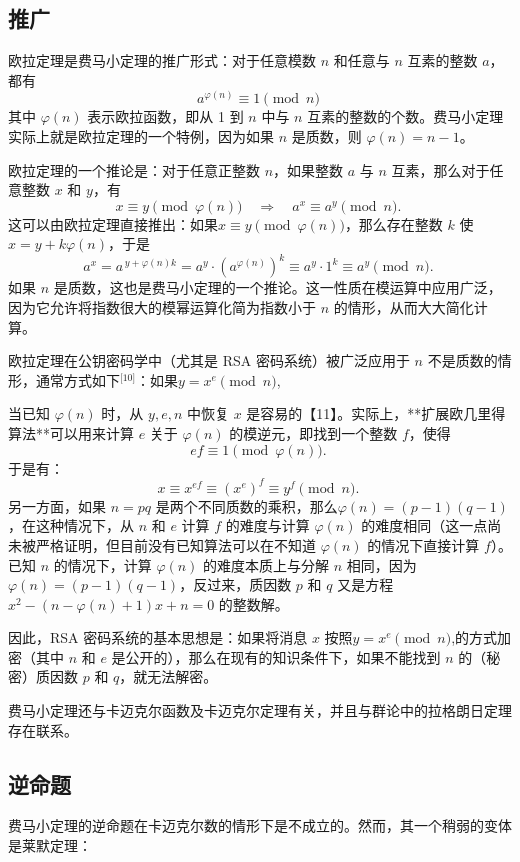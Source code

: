 \subsection{推广}
欧拉定理是费马小定理的推广形式：对于任意模数 $n$ 和任意与 $n$ 互素的整数 $a$，都有
$$
a^{\varphi(n)} \equiv 1 \pmod{n}~
$$
其中 $\varphi(n)$ 表示欧拉函数，即从 1 到 $n$ 中与 $n$ 互素的整数的个数。费马小定理实际上就是欧拉定理的一个特例，因为如果 $n$ 是质数，则 $\varphi(n) = n - 1$。

欧拉定理的一个推论是：对于任意正整数 $n$，如果整数 $a$ 与 $n$ 互素，那么对于任意整数 $x$ 和 $y$，有
$$
x \equiv y \pmod{\varphi(n)} \quad \Rightarrow \quad a^x \equiv a^y \pmod{n}.~
$$
这可以由欧拉定理直接推出：如果$x \equiv y \pmod{\varphi(n)}$，那么存在整数 $k$ 使 $x = y + k\varphi(n)$，于是
$$
a^x = a^{\,y + \varphi(n)k} = a^y \cdot \left(a^{\varphi(n)}\right)^k \equiv a^y \cdot 1^k \equiv a^y \pmod{n}.~
$$
如果 $n$ 是质数，这也是费马小定理的一个推论。这一性质在模运算中应用广泛，因为它允许将指数很大的模幂运算化简为指数小于 $n$ 的情形，从而大大简化计算。

欧拉定理在公钥密码学中（尤其是 RSA 密码系统）被广泛应用于 $n$ 不是质数的情形，通常方式如下\(^\text{[10]}\)：如果$y = x^e \pmod{n}$,

当已知 $\varphi(n)$ 时，从 $y, e, n$ 中恢复 $x$ 是容易的【11】。实际上，**扩展欧几里得算法**可以用来计算 $e$ 关于 $\varphi(n)$ 的模逆元，即找到一个整数 $f$，使得
$$
ef \equiv 1 \pmod{\varphi(n)}.~
$$
于是有：
$$
x \equiv x^{ef} \equiv (x^e)^f \equiv y^f \pmod{n}.~
$$
另一方面，如果 $n = pq$ 是两个不同质数的乘积，那么$\varphi(n) = (p - 1)(q - 1)$，在这种情况下，从 $n$ 和 $e$ 计算 $f$ 的难度与计算 $\varphi(n)$ 的难度相同（这一点尚未被严格证明，但目前没有已知算法可以在不知道 $\varphi(n)$ 的情况下直接计算 $f$）。已知 $n$ 的情况下，计算 $\varphi(n)$ 的难度本质上与分解 $n$ 相同，因为$\varphi(n) = (p - 1)(q - 1)$，反过来，质因数 $p$ 和 $q$ 又是方程$x^2 - (n - \varphi(n) + 1)x + n = 0$
的整数解。

因此，RSA 密码系统的基本思想是：如果将消息 $x$ 按照$y = x^e \pmod{n}$,的方式加密（其中 $n$ 和 $e$ 是公开的），那么在现有的知识条件下，如果不能找到 $n$ 的（秘密）质因数 $p$ 和 $q$，就无法解密。

费马小定理还与卡迈克尔函数及卡迈克尔定理有关，并且与群论中的拉格朗日定理存在联系。
\subsection{逆命题}
费马小定理的逆命题在卡迈克尔数的情形下是不成立的。然而，其一个稍弱的变体是莱默定理：

